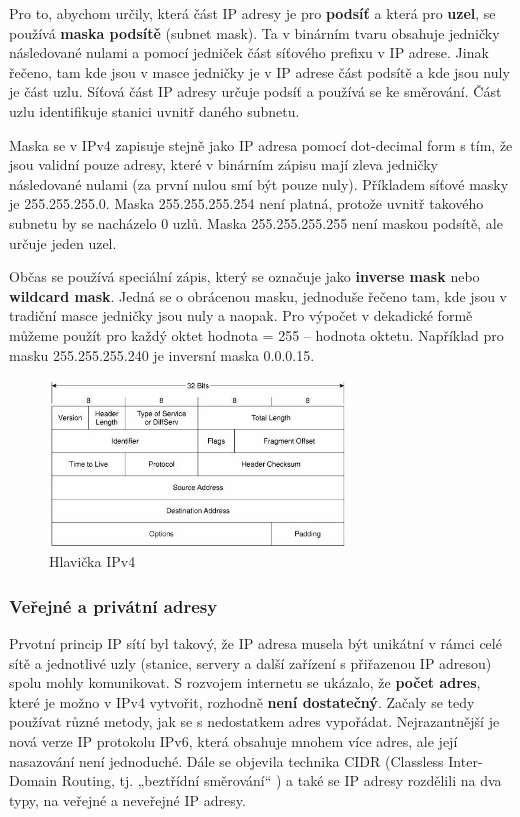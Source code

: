 Pro to, abychom určily, která část IP adresy je pro \textbf{podsíť} a která pro \textbf{uzel}, se používá \textbf{maska podsítě} (subnet mask). Ta v binárním tvaru obsahuje jedničky následované nulami a pomocí jedniček část síťového prefixu v IP adrese. Jinak řečeno, tam kde jsou v masce jedničky je v IP adrese část podsítě a kde jsou nuly je část uzlu. Síťová část IP adresy určuje podsíť a používá se ke směrování. Část uzlu identifikuje stanici uvnitř daného subnetu.

Maska se v IPv4 zapisuje stejně jako IP adresa pomocí dot-decimal form s tím, že jsou validní pouze adresy, které v binárním zápisu mají zleva jedničky následované nulami (za první nulou smí být pouze nuly). Příkladem síťové masky je 255.255.255.0. Maska 255.255.255.254 není platná, protože uvnitř takového subnetu by se nacházelo 0 uzlů. Maska 255.255.255.255 není maskou podsítě, ale určuje jeden uzel.

Občas se používá speciální zápis, který se označuje jako \textbf{inverse mask} nebo \textbf{wildcard mask}. Jedná se o obrácenou masku, jednoduše řečeno tam, kde jsou v tradiční masce jedničky jsou nuly a naopak. Pro výpočet v dekadické formě můžeme použít pro každý oktet hodnota = 255 – hodnota oktetu. Například pro masku 255.255.255.240 je inversní maska 0.0.0.15.

\begin{figure}[H]
	\centering
	\includegraphics[width=0.7\textwidth]{assets/ipv4-header}
	\caption{Hlavička IPv4}
\end{figure}

\subsubsection{Veřejné a privátní adresy}
Prvotní princip IP sítí byl takový, že IP adresa musela být unikátní v rámci celé sítě a jednotlivé uzly (stanice, servery a další zařízení s přiřazenou IP adresou) spolu mohly komunikovat. S rozvojem internetu se ukázalo, že \textbf{počet adres}, které je možno v IPv4 vytvořit, rozhodně \textbf{není dostatečný}. Začaly se tedy používat různé metody, jak se  s nedostatkem adres vypořádat. Nejrazantnější je nová verze IP protokolu IPv6, která obsahuje mnohem více adres, ale její nasazování není jednoduché. Dále se objevila technika CIDR (Classless Inter-Domain Routing, tj. „beztřídní směrování“ ) a také se IP adresy rozdělili na dva typy, na veřejné a neveřejné IP adresy.


